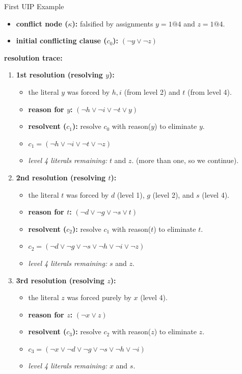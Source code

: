 \documentclass[a4paper, 11pt]{report}
\begin{document}
\begin{gframe}{First UIP Example}
\begin{itemize}
    \item \textbf{conflict node ($\kappa$):} falsified by assignments $y=1@4$ and $z=1@4$.
    \item \textbf{initial conflicting clause ($c_0$):} $(\neg y \lor \neg z)$
\end{itemize}

\textbf{resolution trace:}
\begin{enumerate}
    \item \textbf{1st resolution (resolving $y$):}
    \begin{itemize}
        \item the literal $y$ was forced by $h, i$ (from level 2) and $t$ (from level 4). 
        \item \textbf{reason for $y$:} $(\neg h \lor \neg i \lor \neg t \lor y)$
        \item \textbf{resolvent ($c_1$):} resolve $c_0$ with reason($y$) to eliminate $y$.
        \item $c_1 = (\neg h \lor \neg i \lor \neg t \lor \neg z)$
        \item \textit{level 4 literals remaining:} $t$ and $z$. (more than one, so we continue).
    \end{itemize}

    \item \textbf{2nd resolution (resolving $t$):}
    \begin{itemize}
        \item the literal $t$ was forced by $d$ (level 1), $g$ (level 2), and $s$ (level 4).
        \item \textbf{reason for $t$:} $(\neg d \lor \neg g \lor \neg s \lor t)$
        \item \textbf{resolvent ($c_2$):} resolve $c_1$ with reason($t$) to eliminate $t$.
        \item $c_2 = (\neg d \lor \neg g \lor \neg s \lor \neg h \lor \neg i \lor \neg z)$
        \item \textit{level 4 literals remaining:} $s$ and $z$.
    \end{itemize}

    \item \textbf{3rd resolution (resolving $z$):}
    \begin{itemize}
        \item the literal $z$ was forced purely by $x$ (level 4).
        \item \textbf{reason for $z$:} $(\neg x \lor z)$
        \item \textbf{resolvent ($c_3$):} resolve $c_2$ with reason($z$) to eliminate $z$.
        \item $c_3 = (\neg x \lor \neg d \lor \neg g \lor \neg s \lor \neg h \lor \neg i)$
        \item \textit{level 4 literals remaining:} $x$ and $s$.
    \end{itemize}


\end{enumerate}
\end{gframe}
\end{document}
